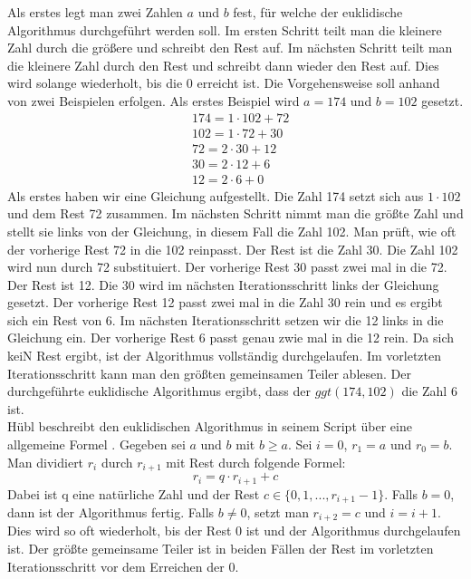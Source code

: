 Als erstes legt man zwei Zahlen $a$ und $b$ fest, für welche der euklidische Algorithmus durchgeführt werden soll. Im ersten Schritt teilt man die kleinere Zahl durch die größere und schreibt den Rest auf. Im nächsten Schritt teilt man die kleinere Zahl durch den Rest und schreibt dann wieder den Rest auf. Dies wird solange wiederholt, bis die 0 erreicht ist. Die Vorgehensweise soll anhand von zwei Beispielen erfolgen. Als erstes Beispiel wird $a = 174$ und $b = 102$ gesetzt.
\begin{align*}
&174 = 1 \cdot 102 + 72\\
&102 = 1 \cdot 72 + 30\\
&72 = 2 \cdot 30 + 12\\
&30 = 2 \cdot 12 + 6\\
&12 = 2 \cdot 6 + 0
\end{align*}
Als erstes haben wir eine Gleichung aufgestellt. Die Zahl 174 setzt sich aus $1 \cdot 102$ und dem Rest 72 zusammen. Im nächsten Schritt nimmt man die größte Zahl und stellt sie links von der Gleichung, in diesem Fall die Zahl 102. Man prüft, wie oft der vorherige Rest 72 in die 102 reinpasst. Der Rest ist die Zahl 30. Die Zahl 102 wird nun durch 72 substituiert. Der vorherige Rest 30 passt zwei mal in die 72. Der Rest ist 12. Die 30 wird im nächsten Iterationsschritt links der Gleichung gesetzt.  Der vorherige Rest 12 passt zwei mal in die Zahl 30 rein und es ergibt sich ein Rest von 6. Im nächsten Iterationsschritt setzen wir die 12 links in die Gleichung ein. Der vorherige Rest 6 passt genau zwie mal in die 12 rein. Da sich keiN Rest ergibt, ist der Algorithmus vollständig durchgelaufen. Im vorletzten Iterationsschritt kann man den größten gemeinsamen Teiler ablesen. Der durchgeführte euklidische Algorithmus ergibt, dass der $ggt(174, 102)$ die Zahl 6 ist.\\

Hübl beschreibt den euklidischen Algorithmus in seinem Script über eine allgemeine Formel \cite[S. 256-257]{Dr.ReinholdHubl.2022}. Gegeben sei $a$ und $b$ mit $b \geq a$. Sei $i = 0$, $r_{1} = a$ und $r_{0} = b$. Man dividiert $r_{i}$ durch $r_{i + 1}$ mit Rest durch folgende Formel: $$r_{i} = q \cdot r_{i + 1} + c$$
Dabei ist q eine natürliche Zahl und der Rest $c \in \{0, 1, ..., r_{i + 1} - 1\}$. Falls $b = 0$, dann ist der Algorithmus fertig. Falls $b \neq 0$, setzt man $r_{i + 2} = c$ und $i = i + 1$. Dies wird so oft wiederholt, bis der Rest 0 ist und der Algorithmus durchgelaufen ist. Der größte gemeinsame Teiler ist in beiden Fällen der Rest im vorletzten Iterationsschritt vor dem Erreichen der 0.\\

